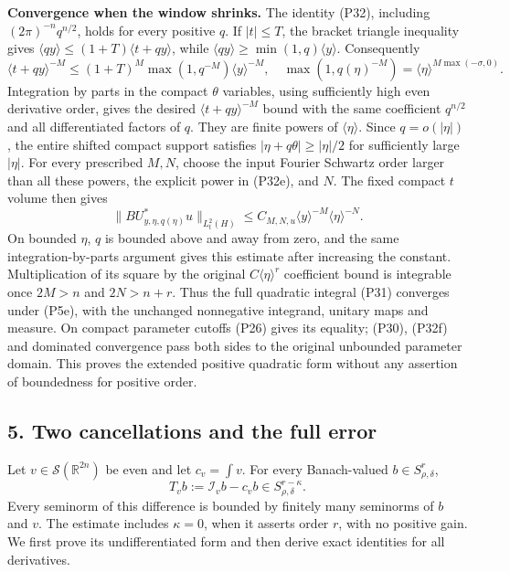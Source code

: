 \documentclass[
  11pt,
]{article}
\begin{document}
\textbf{Convergence when the window shrinks.} The identity (P32),
including \((2\pi)^{-n}q^{n/2}\), holds for every positive \(q\). If
\(|t|\leq T\), the bracket triangle inequality gives
\(\langle qy\rangle\leq(1+T)\langle t+qy\rangle\), while
\(\langle qy\rangle\geq\min(1,q)\langle y\rangle\). Consequently \[
 \langle t+qy\rangle^{-M}
 \leq(1+T)^M\max(1,q^{-M})\langle y\rangle^{-M},
 \quad
 \max(1,q(\eta)^{-M})=\langle\eta\rangle^{M\max(-\sigma,0)}.
 \tag{P32e}
\] Integration by parts in the compact \(\theta\) variables, using
sufficiently high even derivative order, gives the desired
\(\langle t+qy\rangle^{-M}\) bound with the same coefficient \(q^{n/2}\)
and all differentiated factors of \(q\). They are finite powers of
\(\langle\eta\rangle\). Since \(q=o(|\eta|)\), the entire shifted
compact support satisfies \(|\eta+q\theta|\geq|\eta|/2\) for
sufficiently large \(|\eta|\). For every prescribed \(M,N\), choose the
input Fourier Schwartz order larger than all these powers, the explicit
power in (P32e), and \(N\). The fixed compact \(t\) volume then gives \[
 \|B U_{y,\eta,q(\eta)}^*u\|_{L^2_t(H)}
 \leq C_{M,N,u}\langle y\rangle^{-M}\langle\eta\rangle^{-N}.
 \tag{P32f}
\] On bounded \(\eta\), \(q\) is bounded above and away from zero, and
the same integration-by-parts argument gives this estimate after
increasing the constant. Multiplication of its square by the original
\(C\langle\eta\rangle^r\) coefficient bound is integrable once \(2M>n\)
and \(2N>n+r\). Thus the full quadratic integral (P31) converges under
(P5e), with the unchanged nonnegative integrand, unitary maps and
measure. On compact parameter cutoffs (P26) gives its equality; (P30),
(P32f) and dominated convergence pass both sides to the original
unbounded parameter domain. This proves the extended positive quadratic
form without any assertion of boundedness for positive order.

\subsection{5. Two cancellations and the full
error}\label{two-cancellations-and-the-full-error}

Let \(v\in\mathcal S(\mathbb R^{2n})\) be even and let \(c_v=\int v\).
For every Banach-valued \(b\in S^r_{\rho,\delta}\), \[
 T_vb:=\mathcal I_vb-c_vb
 \in S^{r-\kappa}_{\rho,\delta}.
\tag{P33}
\] Every seminorm of this difference is bounded by finitely many
seminorms of \(b\) and \(v\). The estimate includes \(\kappa=0\), when
it asserts order \(r\), with no positive gain. We first prove its
undifferentiated form and then derive exact identities for all
derivatives.
\end{document}
